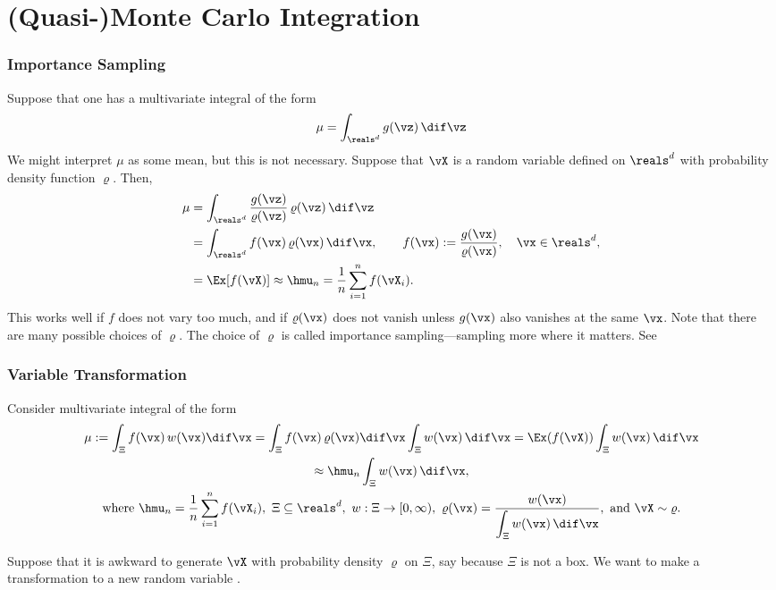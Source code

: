 \documentclass[10pt,compress,xcolor={usenames,dvipsnames}]{beamer} %
\begin{document}
\section{(Quasi-)Monte Carlo Integration}
\begin{frame}
\frametitle{Importance Sampling}
Suppose that one has a multivariate integral of the form 
\[
\mu = \int_{\reals^d} g(\vz) \, \dif \vz
\]
We might interpret $\mu$ as some mean, but this is not necessary.  Suppose that $\vX$ is a random variable defined on $\reals^d$ with probability density function $\varrho$.   Then,
\begin{align*}
\mu &= \int_{\reals^d} \frac{g(\vz)}{\varrho(\vz)} \, \varrho(\vz) \, \dif \vz \\
& = \int_{\reals^d} f(\vx) \, \varrho(\vx) \, \dif \vx, \qquad f(\vx):= \frac{g(\vx)}{\varrho(\vx)}, \quad \vx \in \reals^d, \\
& = \Ex[f(\vX)] \approx \hmu_n = \frac 1n \sum_{i=1}^n f(\vX_i).
\end{align*}
This works well if $f$ does not vary too much, and if $\varrho(\vx)$ does not vanish unless $g(\vx)$ also vanishes at the same $\vx$.  Note that there are many possible choices of $\varrho$.  The choice of $\varrho$ is called importance sampling---\alert{sampling more where it matters}.  See 

\end{frame}

\begin{frame}
\frametitle{Variable Transformation}
Consider multivariate integral of the form 
\begin{multline*}
\mu :=  \int_{\Xi} f(\vx) \, w(\vx) \dif \vx  =  \int_{\Xi} f(\vx) \, \varrho(\vx) \dif \vx \int_{\Xi} w(\vx) \, \dif \vx =    \Ex(f(\vX)) \int_{\Xi} w(\vx) \, \dif \vx  \\
\approx \hmu_n \int_{\Xi} w(\vx) \, \dif \vx, \\  
\text{where }\hmu_n = \frac 1n \sum_{i=1}^n f(\vX_i), \
\Xi \subseteq \reals^d, \ w : \Xi \to [0,\infty), \
\varrho(\vx) = \frac{w(\vx)}{\displaystyle \int_{\Xi} w(\vx) \, \dif \vx}, \text{ and } \vX \sim \varrho.
\end{multline*}

Suppose that it is \alert{awkward to generate} $\vX$ with probability density $\varrho$ on $\Xi$, say because $\Xi$ is not a box.  
We want to make a transformation to a new random variable . 

\end{frame}
\end{document}
